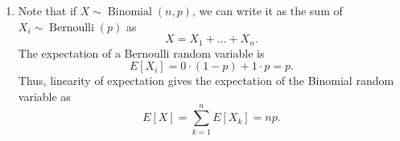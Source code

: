 \documentclass[10pt]{article}
\newcommand\op[1]{\operatorname{#1}}
\newcommand\E[1]{E[#1]}
\begin{document}
\begin{enumerate}
            \item Note that if $X \sim \op{Binomial}(n, p)$, we can write it as the sum
            of $X_i \sim \op{Bernoulli}(p)$ as \[
                X = X_1 + \dots + X_n.
            \] The expectation of a Bernoulli random variable is \[
                \E{X_i} = 0\cdot (1 - p) + 1\cdot p = p.
            \] Thus, linearity of expectation gives the expectation of the Binomial
            random variable as \[
                \E{X} = \sum_{k = 1}^n \E{X_k} = np.
            \] 
        \end{enumerate}
        
\end{document}
